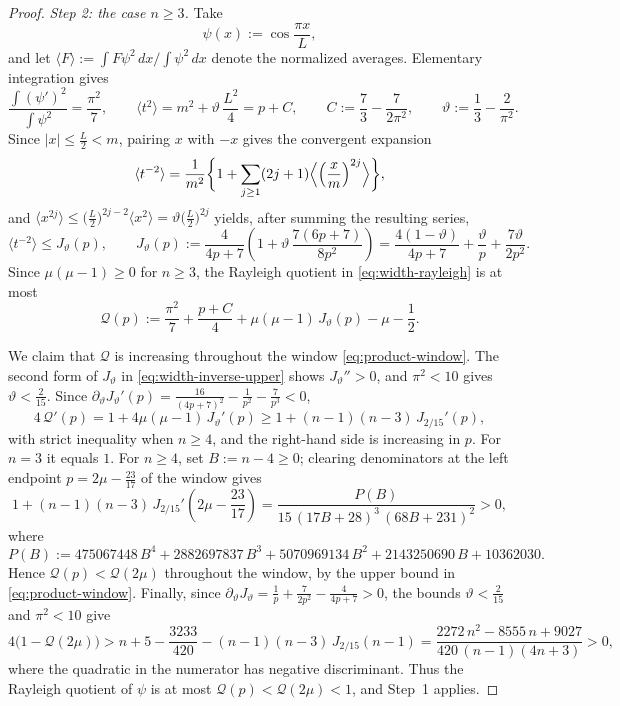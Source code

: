 \documentclass[10pt,a4paper]{amsart}
\begin{document}
\begin{proof}
\emph{Step 2: the case $n\geq3$.} Take
\[
    \psi(x):=\cos\frac{\pi x}{L},
\]
and let $\langle F\rangle:=\int F\psi^2\,dx\big/\!\int\psi^2\,dx$ denote the normalized averages. Elementary integration gives
\begin{equation}\label{eq:width-cos-moments}
    \frac{\int(\psi')^2}{\int\psi^2}=\frac{\pi^2}{7},
    \qquad
    \langle t^2\rangle=m^2+\vartheta\,\frac{L^2}4=p+C,
    \qquad
    C:=\frac73-\frac7{2\pi^2},
    \qquad
    \vartheta:=\frac13-\frac2{\pi^2}.
\end{equation}
Since $|x|\leq\frac L2<m$, pairing $x$ with $-x$ gives the convergent expansion
\[
    \langle t^{-2}\rangle
    =\frac1{m^2}\biggl\{1+\sum_{j\geq1}(2j+1)\Bigl\langle\Bigl(\frac xm\Bigr)^{2j}\Bigr\rangle\biggr\},
\]
and $\langle x^{2j}\rangle\leq\bigl(\tfrac L2\bigr)^{2j-2}\langle x^2\rangle=\vartheta\bigl(\tfrac L2\bigr)^{2j}$ yields, after summing the resulting series,
\begin{equation}\label{eq:width-inverse-upper}
    \langle t^{-2}\rangle\leq J_\vartheta(p),
    \qquad
    J_\vartheta(p):=\frac4{4p+7}\left(1+\vartheta\,\frac{7(6p+7)}{8p^2}\right)
    =\frac{4(1-\vartheta)}{4p+7}+\frac\vartheta p+\frac{7\vartheta}{2p^2}.
\end{equation}
Since $\mu(\mu-1)\geq0$ for $n\geq3$, the Rayleigh quotient in \eqref{eq:width-rayleigh} is at most
\begin{equation}\label{eq:width-Q}
    \mathcal Q(p):=\frac{\pi^2}7+\frac{p+C}4+\mu(\mu-1)\,J_\vartheta(p)-\mu-\frac12 .
\end{equation}

We claim that $\mathcal Q$ is increasing throughout the window \eqref{eq:product-window}. The second form of $J_\vartheta$ in \eqref{eq:width-inverse-upper} shows $J_\vartheta''>0$, and $\pi^2<10$ gives $\vartheta<\frac2{15}$. Since $\partial_\vartheta J_\vartheta'(p)=\frac{16}{(4p+7)^2}-\frac1{p^2}-\frac7{p^3}<0$,
\[
    4\,\mathcal Q'(p)
    =1+4\mu(\mu-1)\,J_\vartheta'(p)
    \geq 1+(n-1)(n-3)\,J_{2/15}'(p),
\]
with strict inequality when $n\geq 4$, and the right-hand side is increasing in $p$. For $n=3$ it equals $1$. For $n\geq4$, set $B:=n-4\geq0$; clearing denominators at the left endpoint $p=2\mu-\frac{23}{17}$ of the window gives
\[
    1+(n-1)(n-3)\,J_{2/15}'\!\left(2\mu-\frac{23}{17}\right)
    =\frac{P(B)}{15\,(17B+28)^3\,(68B+231)^2}>0,
\]
where
\[
    P(B):=475067448\,B^4+2882697837\,B^3+5070969134\,B^2+2143250690\,B+10362030 .
\]
Hence $\mathcal Q(p)<\mathcal Q(2\mu)$ throughout the window, by the upper bound in \eqref{eq:product-window}. Finally, since $\partial_\vartheta J_\vartheta=\frac1p+\frac7{2p^2}-\frac4{4p+7}>0$, the bounds $\vartheta<\frac2{15}$ and $\pi^2<10$ give
\[
    4\bigl(1-\mathcal Q(2\mu)\bigr)
    >n+5-\frac{3233}{420}-(n-1)(n-3)\,J_{2/15}(n-1)
    =\frac{2272\,n^2-8555\,n+9027}{420\,(n-1)(4n+3)}>0,
\]
where the quadratic in the numerator has negative discriminant. Thus the Rayleigh quotient of $\psi$ is at most $\mathcal Q(p)<\mathcal Q(2\mu)<1$, and Step~1 applies.


\end{proof}
\end{document}
